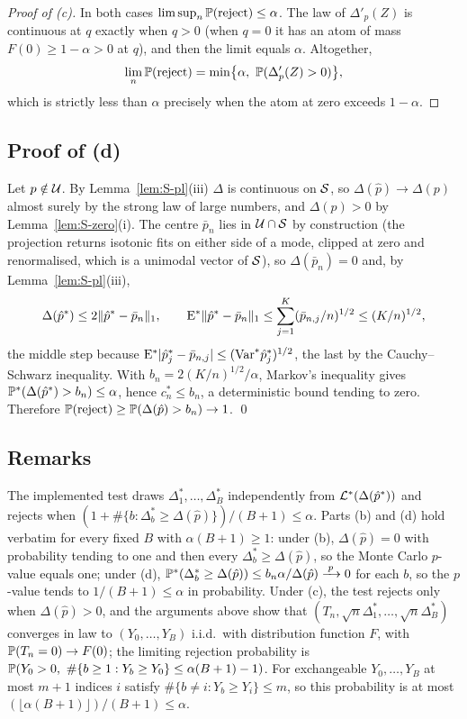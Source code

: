\begin{proof}[Proof of (c)]
In both cases $\limsup_n\mathbb{P}(\text{reject})\le\alpha$. The law of $\Delta'_p(Z)$ is continuous at $q$ exactly when $q>0$ (when $q=0$ it has an atom of mass $F(0)\ge1-\alpha>0$ at $q$), and then the limit equals $\alpha$. Altogether,
\[
\lim_n\Prob(\text{reject})=\min\bigl\{\alpha,\ \Prob(\Delta'_p(Z)>0)\bigr\},
\]
which is strictly less than $\alpha$ precisely when the atom at zero exceeds $1-\alpha$.
\end{proof}

\subsection{Proof of (d)}

Let $p\notin\mathcal{U}$. By Lemma~\ref{lem:S-pl}(iii) $\Delta$ is continuous on $\mathcal{S}$, so $\Delta(\hat p)\to\Delta(p)$ almost surely by the strong law of large numbers, and $\Delta(p)>0$ by Lemma~\ref{lem:S-zero}(i). The centre $\bar p_n$ lies in $\mathcal{U}\cap\mathcal{S}$ by construction (the projection returns isotonic fits on either side of a mode, clipped at zero and renormalised, which is a unimodal vector of $\mathcal{S}$), so $\Delta(\bar p_n)=0$ and, by Lemma~\ref{lem:S-pl}(iii),
\[
\Delta(\hat p^\ast)\le2\|\hat p^\ast-\bar p_n\|_1,\qquad
\mathrm{E}^\ast\|\hat p^\ast-\bar p_n\|_1\le\sum_{j=1}^K(\bar p_{n,j}/n)^{1/2}\le(K/n)^{1/2},
\]
the middle step because $\mathrm{E}^\ast|\hat p^\ast_j-\bar p_{n,j}|\le(\mathrm{Var}^\ast\hat p^\ast_j)^{1/2}$, the last by the Cauchy--Schwarz inequality. With $b_n=2(K/n)^{1/2}/\alpha$, Markov's inequality gives $\mathbb{P}^\ast(\Delta(\hat p^\ast)>b_n)\le\alpha$, hence $c^\ast_n\le b_n$, a deterministic bound tending to zero. Therefore $\mathbb{P}(\text{reject})\ge\mathbb{P}(\Delta(\hat p)>b_n)\to1$. \qed

\subsection{Remarks}

\begin{remark}\label{rem:supp-mc}
The implemented test draws $\Delta^\ast_1,\dots,\Delta^\ast_B$ independently from $\mathcal{L}^\ast(\Delta(\hat p^\ast))$ and rejects when $(1+\#\{b:\Delta^\ast_b\ge\Delta(\hat p)\})/(B+1)\le\alpha$. Parts (b) and (d) hold verbatim for every fixed $B$ with $\alpha(B+1)\ge1$: under (b), $\Delta(\hat p)=0$ with probability tending to one and then every $\Delta^\ast_b\ge\Delta(\hat p)$, so the Monte Carlo $p$-value equals one; under (d), $\mathbb{P}^\ast(\Delta^\ast_b\ge\Delta(\hat p))\le b_n\alpha/\Delta(\hat p)\xrightarrow{\;p\;}0$ for each $b$, so the $p$-value tends to $1/(B+1)\le\alpha$ in probability. Under (c), the test rejects only when $\Delta(\hat p)>0$, and the arguments above show that $(T_n,\sqrt n\Delta^\ast_1,\dots,\sqrt n\Delta^\ast_B)$ converges in law to $(Y_0,\dots,Y_B)$ i.i.d.\ with distribution function $F$, with $\mathbb{P}(T_n=0)\to F(0)$; the limiting rejection probability is $\mathbb{P}(Y_0>0,\ \#\{b\ge1:Y_b\ge Y_0\}\le\alpha(B+1)-1)$. For exchangeable $Y_0,\dots,Y_B$ at most $m+1$ indices $i$ satisfy $\#\{b\ne i:Y_b\ge Y_i\}\le m$, so this probability is at most $(\lfloor\alpha(B+1)\rfloor)/(B+1)\le\alpha$.
\end{remark}

